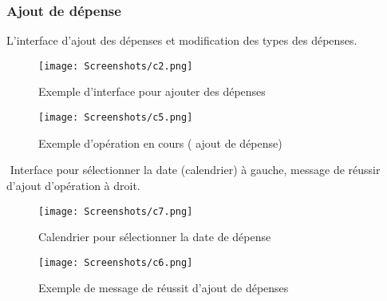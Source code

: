   \subsubsection{Ajout de dépense}
  L'interface d'ajout des dépenses et modification des types des dépenses.
  \begin{figure}[!htbp]
    \begin{minipage}[t]{0.4\textwidth}    %
            \texttt{[image: Screenshots/c2.png]}
            \caption{ Exemple d'interface pour ajouter des dépenses}
    \end{minipage}%
    \begin{minipage}{0.20\textwidth}
      \hfill
    \end{minipage}
  \begin{minipage}[t]{0.4\textwidth}
          \texttt{[image: Screenshots/c5.png]}
          \caption{ Exemple d'opération en cours ( ajout de dépense) }
  \end{minipage}%
\end{figure}
$ $
\newpage
Interface pour sélectionner la date (calendrier) à gauche, message de réussir d'ajout d'opération à droit.
\begin{figure}[!htbp]
      \begin{minipage}[t]{0.4\textwidth}    %
        \texttt{[image: Screenshots/c7.png]}
        \caption{ Calendrier pour sélectionner la date de dépense}
          \end{minipage}%
          \begin{minipage}{0.20\textwidth}
            \hfill
          \end{minipage}
      \begin{minipage}[t]{0.4\textwidth}    %
              \texttt{[image: Screenshots/c6.png]}
              \caption{ Exemple de message de réussit d'ajout de dépenses}
      \end{minipage}%
      \end{figure}
      $ $
      \newpage
